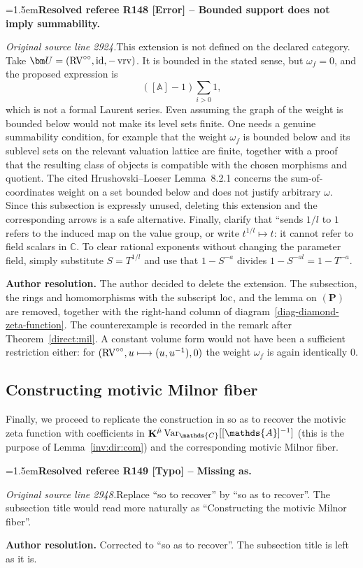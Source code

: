 \documentclass[12pt]{amsart}
\newcommand{\ResolvedRefereeRemark}[5]{%
  \par\medskip\begingroup\normalfont\small\color{gray}%
  \emergencystretch=1.5em\noindent\textbf{Resolved referee R#1 [#2] -- #3.}\par\nobreak\noindent #4\par
  \medskip\color{ResolutionGreen}\noindent\textbf{Author resolution.} #5\par
  \endgroup\medskip
}
\theoremstyle{plain}
\theoremstyle{definition}
\theoremstyle{remark}
\numberwithin{equation}{section}
\theoremstyle{plain}
\newcommand{\RV}{\textup{RV}}
\newcommand{\A}{\mathds{A}}
\newcommand{\C}{\mathds{C}}
\newcommand{\0}{\emptyset}
\newcommand{\efun}{\longmapsto}
\DeclareMathOperator{\ggk}{\mathbf{K}}
\DeclareMathOperator{\vrv}{vrv}
\newcommand{\var}{\textup{Var}}
\newcommand{\loc}{\textup{loc}}
\newcommand{\gmv}{\ggk^{\hat \mu}\var_{\C}}
\begin{document}
\ResolvedRefereeRemark{148}{Error}{Bounded support does not imply summability}{%
\textit{Original source line 2924.}\quad This extension is not defined on the declared category. Take $\bm U=(\RV^{\circ\circ},\mathrm{id},-\vrv)$. It is bounded in the stated sense, but $\omega_f=0$, and the proposed expression is
\[
 ([\A]-1)\sum_{i>0}1,
\]
which is not a formal Laurent series. Even assuming the graph of the weight is bounded below would not make its level sets finite. One needs a genuine summability condition, for example that the weight $\omega_f$ is bounded below and its sublevel sets on the relevant valuation lattice are finite, together with a proof that the resulting class of objects is compatible with the chosen morphisms and quotient. The cited Hrushovski--Loeser Lemma~8.2.1 concerns the sum-of-coordinates weight on a set bounded below and does not justify arbitrary $\omega$. Since this subsection is expressly unused, deleting this extension and the corresponding arrows is a safe alternative. Finally, clarify that ``sends $1/l$ to $1$ refers to the induced map on the value group, or write $t^{1/l}\mapsto t$: it cannot refer to field scalars in $\C$. To clear rational exponents without changing the parameter field, simply substitute $S=T^{1/l}$ and use that $1-S^{-a}$ divides $1-S^{-al}=1-T^{-a}$.
}{The author decided to delete the extension. The subsection, the rings and homomorphisms with the subscript $\loc$, and the lemma on $(\bm P)$ are removed, together with the right-hand column of diagram~\eqref{diag-diamond-zeta-function}. The counterexample is recorded in the remark after Theorem~\ref{direct:mil}. A constant volume form would not have been a sufficient restriction either: for $(\RV^{\circ\circ}, u \efun (u, u^{-1}), 0)$ the weight $\omega_f$ is again identically $0$.}





\subsection{Constructing motivic Milnor fiber}\label{sec:milnor}

Finally, we proceed to replicate the construction in \cite[\S~8]{hru:loe:lef} so as to recover the motivic zeta function with coefficients in $\gmv[[\A]^{-1}]$ (this is the purpose of Lemma~\ref{inv:dir:com}) and the corresponding motivic Milnor fiber.

\ResolvedRefereeRemark{149}{Typo}{Missing as}{%
\textit{Original source line 2948.}\quad Replace ``so to recover'' by ``so as to recover''. The subsection title would read more naturally as ``Constructing the motivic Milnor fiber''. 
}{Corrected to ``so as to recover''. The subsection title is left as it is.}
\end{document}
